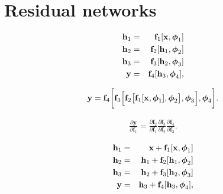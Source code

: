 \documentclass[letterpaper,twoside,openany, titlepage,oldfontcommands,titles,dvipsnames]{memoir}
\begin{document}
 \chapter{Residual networks}

\begin{eqnarray}\label{eq:residual_sequential}
  \mbox{\bf h}_1 &=& \mbox{\bf f}_{1}[\mathbf{x},
  \boldsymbol\phi_{1}]\nonumber \\
  \mbox{\bf h}_2 &=& \mbox{\bf f}_{2}[\mathbf{h}_{1},\boldsymbol\phi_{2}]\nonumber \\
  \mbox{\bf h}_3 &=& \mbox{\bf f}_{3}[\mathbf{h}_{2},\boldsymbol\phi_{3}]\nonumber \\
  \mathbf{y} &=& \mbox{\bf f}_{4}[\mathbf{h}_{3},\boldsymbol\phi_{4}],
 \end{eqnarray}

\begin{eqnarray}
  \mathbf{y}= \mbox{\bf f}_{4}\biggl[\mbox{\bf f}_{3}\Bigl[\mbox{\bf f}_{2}\bigl[\mbox{\bf f}_{1}[\mathbf{x},\boldsymbol\phi_{1}],\boldsymbol\phi_{2}\bigr],\boldsymbol\phi_{3}\Bigr],\boldsymbol\phi_{4}\biggr].
 \end{eqnarray}

\begin{eqnarray}\label{eq:residual_chain}
  \frac{\partial \mathbf{y}}{\partial \mathbf{f}_1} = \frac{\partial \mathbf{f}_{2}}{\partial \mathbf{f}_{1}}\frac{\partial \mathbf{f}_{3}}{\partial \mathbf{f}_{2}}\frac{\partial \mathbf{f}_{4}}{\partial \mathbf{f}_{3}}.
 \end{eqnarray}

\begin{eqnarray}\label{eq:residual_example}
  \mathbf{h}_{1} &=& \mathbf{x} + \mbox{\bf f}_{1}[\mathbf{x},\boldsymbol\phi_{1}]\nonumber \\
  \mathbf{h}_{2} &=& \mathbf{h}_{1} + \mbox{\bf f}_{2}[\mathbf{h}_{1},\boldsymbol\phi_{2}]\nonumber \\
  \mathbf{h}_3 &=& \mathbf{h}_{2} + \mbox{\bf f}_{3}[\mathbf{h}_{2},\boldsymbol\phi_{3}]\nonumber \\
  \mathbf{y} &=& \mathbf{h}_{3} + \mbox{\bf f}_{4}[\mathbf{h}_{3}, \boldsymbol\phi_{4}],
 \end{eqnarray}
\end{document}
